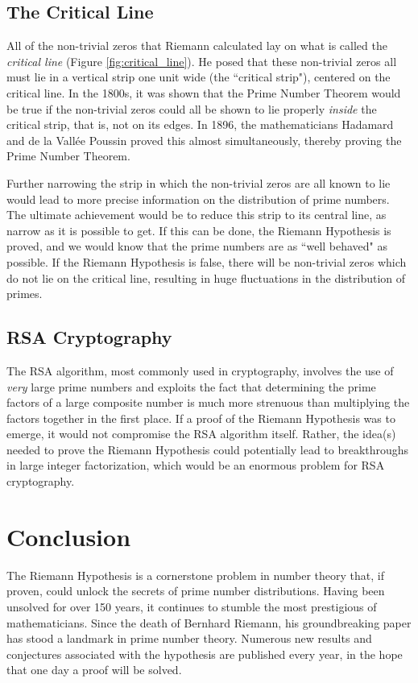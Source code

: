 \documentclass[12pt]{article}
\theoremstyle{plain}
\begin{document}
	\subsection{The Critical Line}
	
	All of the non-trivial zeros that Riemann calculated lay on what is called the \textit{critical line} (Figure \ref{fig:critical_line}). He posed that these non-trivial zeros all must lie in a vertical strip one unit wide (the ``critical strip"), centered on the critical line. In the 1800s, it was shown that the Prime Number Theorem would be true if the non-trivial zeros could all be shown to lie properly \textit{inside} the critical strip, that is, not on its edges. In 1896, the mathematicians Hadamard and de la Vall\'{e}e Poussin proved this almost simultaneously, thereby proving the Prime Number Theorem.
	
	Further narrowing the strip in which the non-trivial zeros are all known to lie would lead to more precise information on the distribution of prime numbers. The ultimate achievement would be to reduce this strip to its central line, as narrow as it is possible to get. If this can be done, the Riemann Hypothesis is proved, and we would know that the prime numbers are as ``well behaved" as possible. If the Riemann Hypothesis is false, there will be non-trivial zeros which do not lie on the critical line, resulting in huge fluctuations in the distribution of primes.
	
	\subsection{RSA Cryptography}
	
	The RSA algorithm, most commonly used in cryptography, involves the use of \textit{very} large prime numbers and exploits the fact that determining the prime factors of a large composite number is much more strenuous than multiplying the factors together in the first place. If a proof of the Riemann Hypothesis was to emerge, it would not compromise the RSA algorithm itself. Rather, the idea(s) needed to prove the Riemann Hypothesis could potentially lead to breakthroughs in large integer factorization, which would be an enormous problem for RSA cryptography.
	
	
	\section{Conclusion}
	
	The Riemann Hypothesis is a cornerstone problem in number theory that, if proven, could unlock the secrets of prime number distributions. Having been unsolved for over 150 years, it continues to stumble the most prestigious of mathematicians. Since the death of Bernhard Riemann, his groundbreaking paper has stood a landmark in prime number theory. Numerous new results and conjectures associated with the hypothesis are published every year, in the hope that one day a proof will be solved.
	
\end{document}
